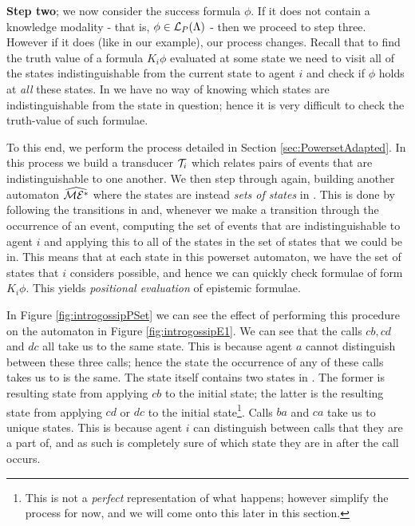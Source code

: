 \documentclass[ %
                    author={Leo Poulson},
                supervisor={Dr. Steven Ramsay},
                    degree={BSc},
                     title={Epistemic Planning for the Dynamic Gossip problem},
                  subtitle={},
                      year={2019} ]{dissertation}
\begin{document}
\textbf{Step two}; we now consider the success formula $\phi$. If it does not
contain a knowledge modality - that is, $\phi \in \mathcal{L}_P(\Lambda)$ - then we
proceed to step three. However if it does (like in our example), our process
changes. Recall that to find the truth value of a formula $K_i \phi$ evaluated at
some state we need to visit all of the states indistinguishable from the current
state to agent $i$ and check if $\phi$ holds at \emph{all} these states. In
\mestar we have no way of knowing which states are indistinguishable from the
state in question; hence it is very difficult to check the truth-value of such
formulae.

To this end, we perform the process detailed in Section
\ref{sec:PowersetAdapted}. In this process we build a transducer $\mathcal{T}_i$
which relates pairs of events that are indistinguishable to one another. We then
step through \mestar again, building another automaton $\widehat{\mathcal{ME^\ast}}$ where
the states are instead \emph{sets of states} in \mestar. This is done by
following the transitions in \mestar and, whenever we make a transition through
the occurrence of an event, computing the set of events that are
indistinguishable to agent $i$ and applying this to all of the states in the set
of states that we could be in. This means that at each state in this powerset
automaton, we have the set of states that $i$ considers possible, and hence we
can quickly check formulae of form $K_i \phi$. This yields \emph{positional
  evaluation} of epistemic formulae.

In Figure \ref{fig:introgossipPSet} we can see the effect of performing this
procedure on the automaton in Figure \ref{fig:introgossipE1}. We can see that the
calls $cb, cd$ and $dc$ all take us to the same state. This is because agent $a$
cannot distinguish between these three calls; hence the state the occurrence of
any of these calls takes us to is the same. The state itself contains two states
in \mestar. The former is resulting state from applying $cb$ to the initial
state; the latter is the resulting state from applying $cd$ or $dc$ to the
initial state\footnote{This is not a \emph{perfect} representation of
  what happens; however simplify the process for now, and we will come onto this
  later in this section.}. Calls $ba$ and $ca$ take us to unique states. This is
because agent $i$ can distinguish between calls that they are a part of, and as
such is completely sure of which state they are in after the call occurs.
\end{document}
